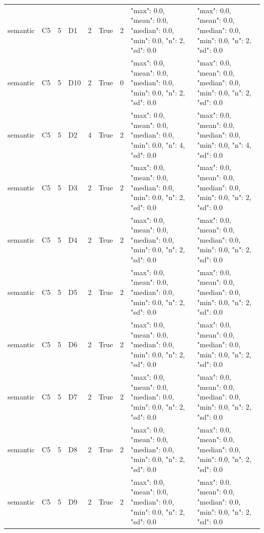 \begin{tabular}{lllllllll}
semantic & C5 & 5 & D1 & 2 & True & 2 & {"max": 0.0, "mean": 0.0, "median": 0.0, "min": 0.0, "n": 2, "sd": 0.0} & {"max": 0.0, "mean": 0.0, "median": 0.0, "min": 0.0, "n": 2, "sd": 0.0} \\
semantic & C5 & 5 & D10 & 2 & True & 0 & {"max": 0.0, "mean": 0.0, "median": 0.0, "min": 0.0, "n": 2, "sd": 0.0} & {"max": 0.0, "mean": 0.0, "median": 0.0, "min": 0.0, "n": 2, "sd": 0.0} \\
semantic & C5 & 5 & D2 & 4 & True & 2 & {"max": 0.0, "mean": 0.0, "median": 0.0, "min": 0.0, "n": 4, "sd": 0.0} & {"max": 0.0, "mean": 0.0, "median": 0.0, "min": 0.0, "n": 4, "sd": 0.0} \\
semantic & C5 & 5 & D3 & 2 & True & 2 & {"max": 0.0, "mean": 0.0, "median": 0.0, "min": 0.0, "n": 2, "sd": 0.0} & {"max": 0.0, "mean": 0.0, "median": 0.0, "min": 0.0, "n": 2, "sd": 0.0} \\
semantic & C5 & 5 & D4 & 2 & True & 2 & {"max": 0.0, "mean": 0.0, "median": 0.0, "min": 0.0, "n": 2, "sd": 0.0} & {"max": 0.0, "mean": 0.0, "median": 0.0, "min": 0.0, "n": 2, "sd": 0.0} \\
semantic & C5 & 5 & D5 & 2 & True & 2 & {"max": 0.0, "mean": 0.0, "median": 0.0, "min": 0.0, "n": 2, "sd": 0.0} & {"max": 0.0, "mean": 0.0, "median": 0.0, "min": 0.0, "n": 2, "sd": 0.0} \\
semantic & C5 & 5 & D6 & 2 & True & 2 & {"max": 0.0, "mean": 0.0, "median": 0.0, "min": 0.0, "n": 2, "sd": 0.0} & {"max": 0.0, "mean": 0.0, "median": 0.0, "min": 0.0, "n": 2, "sd": 0.0} \\
semantic & C5 & 5 & D7 & 2 & True & 2 & {"max": 0.0, "mean": 0.0, "median": 0.0, "min": 0.0, "n": 2, "sd": 0.0} & {"max": 0.0, "mean": 0.0, "median": 0.0, "min": 0.0, "n": 2, "sd": 0.0} \\
semantic & C5 & 5 & D8 & 2 & True & 2 & {"max": 0.0, "mean": 0.0, "median": 0.0, "min": 0.0, "n": 2, "sd": 0.0} & {"max": 0.0, "mean": 0.0, "median": 0.0, "min": 0.0, "n": 2, "sd": 0.0} \\
semantic & C5 & 5 & D9 & 2 & True & 2 & {"max": 0.0, "mean": 0.0, "median": 0.0, "min": 0.0, "n": 2, "sd": 0.0} & {"max": 0.0, "mean": 0.0, "median": 0.0, "min": 0.0, "n": 2, "sd": 0.0} \\
\end{tabular}